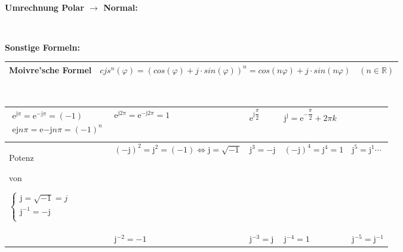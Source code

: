 		\scalebox{1}{}\\[3pt]
		\begin{minipage}[t]{0.5\textwidth}
			\textbf{Umrechnung Polar $\rightarrow$ Normal:}\\[3pt]
		\end{minipage}
		\begin{minipage}[t]{0.5\textwidth}
			\\[3pt]
		\end{minipage}
		\textbf{Sonstige Formeln:}\\[3pt]
		\begin{tabular}{|l|l|}
			\hline
			Moivre'sche Formel & $cjs^n(\varphi) = (cos(\varphi) + j \cdot sin(\varphi))^n = cos(n\varphi) + j \cdot sin(n\varphi) \quad (n \in \mathbb{R})$\\
			\hline
		\end{tabular}\\
		\begin{tabular}{|l|l|l|l|l|}
			\hline
			$\begin{array}{l}
				\mathrm{e}^{\mathrm{j} \pi} = \mathrm{e}^{-\mathrm{j} \pi} = (-1)\\[3pt]
				\mathrm{e}{\mathrm{j} n \pi} = \mathrm{e}{-\mathrm{j} n \pi} = (-1)^n\\[3pt]
			\end{array}$ & $\mathrm{e}^{\mathrm{j} 2 \pi} = \mathrm{e}^{-\mathrm{j} 2 \pi} = 1$ & $\mathrm{e}^{\mathrm{j}\dfrac{\pi}{2}}$ & $\mathrm{j}^{\mathrm{j}} = \mathrm{e}^{-\dfrac{\pi}{2}} + 2 \pi k$ & \\[3pt]
			\hline
			\begin{turn}{90} Potenz \end{turn} \begin{turn}{90} von \end{turn}
			$\left\lbrace \begin{array}{l}
				\mathrm{j} = \sqrt{-1} = j\\[3pt]
				\mathrm{j}^{-1} = -\mathrm{j}\\[3pt]
			\end{array} \right. $ & $(-\mathrm{j})^2 = \mathrm{j}^2 = (-1) \Leftrightarrow \mathrm{j} = \sqrt{-1}$ & $\mathrm{j}^3 = -\mathrm{j}$ & $(-\mathrm{j})^4 = \mathrm{j}^4 = 1$ & $\mathrm{j}^5 = \mathrm{j}^1 \cdots$\\[3pt]
			\hline
			 & $\mathrm{j}^{-2} = -1$ & $\mathrm{j}^{-3} = \mathrm{j}$ & $\mathrm{j}^{-4} = 1$ & $\mathrm{j}^{-5} = \mathrm{j}^{-1}$\\[3pt]		
			\hline
		\end{tabular}\\
